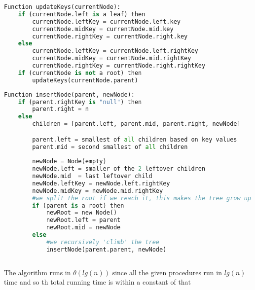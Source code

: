 \documentclass{report}
\begin{document}
\begin{lstlisting}[language=Python]
Function updateKeys(currentNode):
    if (currentNode.left is a leaf) then
        currentNode.leftKey = currentNode.left.key
        currentNode.midKey = currentNode.mid.key
        currentNode.rightKey = currentNode.right.key
    else
        currentNode.leftKey = currentNode.left.rightKey
        currentNode.midKey = currentNode.mid.rightKey
        currentNode.rightKey = currentNode.right.rightKey
    if (currentNode is not a root) then
        updateKeys(currentNode.parent)                                                                  
\end{lstlisting}

\begin{lstlisting}[language=Python]
Function insertNode(parent, newNode):
    if (parent.rightKey is "null") then
        parent.right = n
    else
        children = [parent.left, parent.mid, parent.right, newNode]

        parent.left = smallest of all children based on key values
        parent.mid = second smallest of all children
        
        newNode = Node(empty)
        newNode.left = smaller of the 2 leftover children
        newNode.mid  = last leftover child
        newNode.leftKey = newNode.left.rightKey
        newNode.midKey = newNode.mid.rightKey
        #we split the root if we reach it, this makes the tree grow up only, and makes it balanced
        if (parent is a root) then
            newRoot = new Node()
            newRoot.left = parent
            newRoot.mid = newNode
        else
            #we recursively 'climb' the tree
            insertNode(parent.parent, newNode)
            
\end{lstlisting}

The algorithm runs in $\theta(lg(n))$ since all the given procedures run in $lg(n)$ time and so th total running time is within a constant of that
\end{document}
